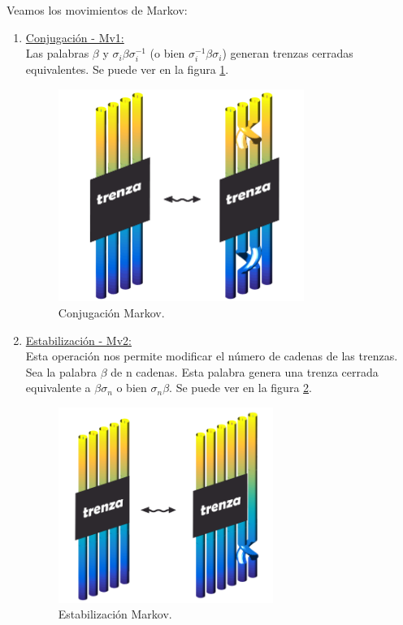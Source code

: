 Veamos los movimientos de Markov:
\begin{enumerate}
	\item \underline{Conjugación - Mv1:} \\
	Las palabras $\beta$ y $\sigma_{i} \beta \sigma_{i}^{-1}$ (o bien  $\sigma_{i}^{-1} \beta \sigma_{i}$) generan trenzas cerradas equivalentes. Se puede ver en la figura \ref{tren11}.
	\begin{figure}[h!]
		\centering
		\includegraphics[width=8cm]{itrenzas/M4.png}
		\caption{Conjugación Markov.}
		\label{tren11} 
	\end{figure}
	
	\item \underline{Estabilización - Mv2:} \\
	Esta operación nos permite modificar el número de cadenas de las trenzas. 
	Sea la palabra $\beta$ de n cadenas. Esta palabra genera una trenza cerrada equivalente a $\beta \sigma_{n}$ o bien $\sigma_{n} \beta $. Se puede ver en la figura \ref{tren12}.
	\begin{figure}[h!]
		\centering
		\includegraphics[width=7cm]{itrenzas/M5.png}
		\caption{Estabilización Markov.}
		\label{tren12} 
	\end{figure}
	
\end{enumerate}

